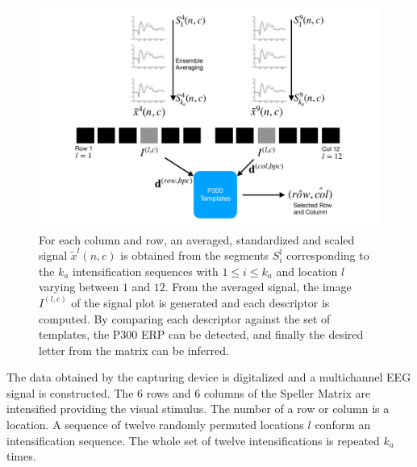 \begin{figure}[htb]
\centering
\includegraphics[width=15cm]{images/classificationgraph.pdf}
\caption[P300 Speller Matrix Letter Identification]{For each column and row, an averaged, standardized and scaled signal $\tilde{x}^l(n,c)$ is obtained from the segments $S_i^l$  corresponding to the $k_a$ intensification sequences with $ 1 \leq i \leq k_a $ and location $l$ varying between $1$ and $12$. From the averaged signal, the image $I^{(l,c)}$ of the signal plot is generated and each descriptor is computed.  By comparing each descriptor against the set of templates, the P300 ERP can be detected, and finally the desired letter from the matrix can be inferred.}
\label{fig:classification}
\end{figure}


The data obtained by the capturing device is digitalized and a multichannel EEG signal is constructed. The $6$ rows and $6$ columns of the Speller Matrix are intensified providing the visual stimulus.  The number of a row or column is a location. A sequence of twelve randomly permuted locations $l$ conform an intensification sequence. The whole set of twelve intensifications is repeated $k_a$ times.


